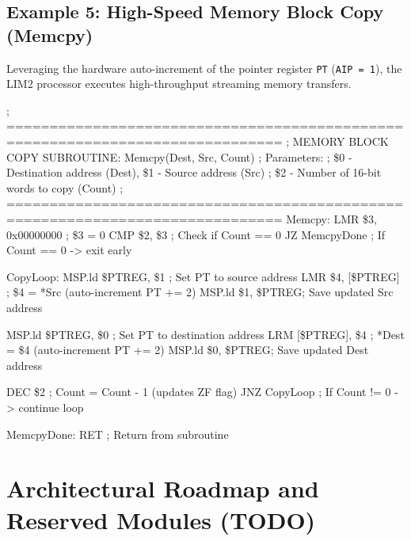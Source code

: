 \documentclass[11pt,a4paper]{article}
\newcommand{\reg}{\$}
\newcommand{\regPTREG}{\$PTREG}
\begin{document}
\subsection{Example 5: High-Speed Memory Block Copy (Memcpy)}

Leveraging the hardware auto-increment of the pointer register \texttt{PT} (\texttt{AIP = 1}), the LIM2 processor executes high-throughput streaming memory transfers.

\begin{examplebox}[title={Listing: Fast Memory Block Copy (memcpy.asm)},top=2.5pt,bottom=2.5pt,unbreakable]
\begin{limasm}
; ==============================================================================
; MEMORY BLOCK COPY SUBROUTINE: Memcpy(Dest, Src, Count)
; Parameters:
;   \reg0 - Destination address (Dest),      \reg1 - Source address (Src)
;   \reg2 - Number of 16-bit words to copy (Count)
; ==============================================================================
Memcpy:
    LMR         \reg3, 0x00000000           ; \reg3 = 0
    CMP         \reg2, \reg3                ; Check if Count == 0
    JZ          MemcpyDone                  ; If Count == 0 -> exit early

CopyLoop:
    MSP.ld      \regPTREG, \reg1            ; Set PT to source address
    LMR         \reg4, [\regPTREG]          ; \reg4 = *Src (auto-increment PT += 2)
    MSP.ld      \reg1, \regPTREG            ; Save updated Src address

    MSP.ld      \regPTREG, \reg0            ; Set PT to destination address
    LRM         [\regPTREG], \reg4          ; *Dest = \reg4 (auto-increment PT += 2)
    MSP.ld      \reg0, \regPTREG            ; Save updated Dest address

    DEC         \reg2                       ; Count = Count - 1 (updates ZF flag)
    JNZ         CopyLoop                    ; If Count != 0 -> continue loop

MemcpyDone:
    RET                                     ; Return from subroutine
\end{limasm}
\end{examplebox}

\vspace{3mm}

\section{Architectural Roadmap and Reserved Modules (TODO)}
\end{document}
